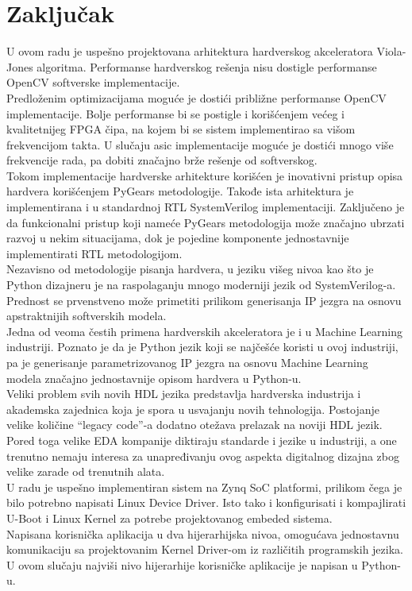 \section{Zaključak}

U ovom radu je uspešno projektovana arhitektura hardverskog akceleratora
Viola-Jones algoritma.
Performanse hardverskog rešenja nisu dostigle performanse OpenCV softverske
implementacije. \\

Predloženim optimizacijama moguće je dostići približne performanse OpenCV
implementacije.
Bolje performanse bi se postigle i korišćenjem većeg i kvalitetnijeg FPGA čipa,
na kojem bi se sistem implementirao sa višom frekvencijom takta.
U slučaju \gls{asic} implementacije moguće je dostići mnogo više
frekvencije rada, pa dobiti značajno brže rešenje od softverskog. \\

Tokom implementacije hardverske arhitekture korišćen je inovativni pristup opisa
hardvera korišćenjem PyGears metodologije.
Takođe ista arhitektura je implementirana i u standardnoj RTL SystemVerilog
implementaciji.
Zaključeno je da funkcionalni pristup koji nameće PyGears metodologija može
značajno ubrzati razvoj u nekim situacijama, dok je pojedine komponente
jednostavnije implementirati RTL metodologijom. \\

Nezavisno od metodologije pisanja hardvera, u jeziku višeg nivoa kao što je
Python dizajneru je na raspolaganju mnogo moderniji jezik od SystemVerilog-a.
Prednost se prvenstveno može primetiti prilikom generisanja IP jezgra na osnovu
apstraktnijih softverskih modela.\\
Jedna od veoma čestih primena hardverskih akceleratora je i u Machine Learning
industriji.
Poznato je da je Python jezik koji se najčešće koristi u ovoj industriji, pa je
generisanje parametrizovanog IP jezgra na osnovu Machine Learning modela značajno
jednostavnije opisom hardvera u Python-u. \\

Veliki problem svih novih HDL jezika predstavlja hardverska industrija i
akademska zajednica koja je spora u usvajanju novih tehnologija.
Postojanje velike količine ``legacy code''-a dodatno otežava prelazak na noviji
HDL jezik. \\
Pored toga velike EDA kompanije diktiraju standarde i jezike u industriji,
a one trenutno nemaju interesa za unapređivanju ovog aspekta digitalnog dizajna
zbog velike zarade od trenutnih alata. \\

U radu je uspešno implementiran sistem na Zynq SoC platformi, prilikom
čega je bilo potrebno napisati Linux Device Driver.
Isto tako i konfigurisati i kompajlirati U-Boot i Linux Kernel za potrebe
projektovanog embeded sistema. \\
Napisana korisnička aplikacija u dva hijerarhijska nivoa, omogućava jednostavnu
komunikaciju sa projektovanim Kernel Driver-om iz različitih programskih jezika.
U ovom slučaju najviši nivo hijerarhije korisničke aplikacije je napisan u
Python-u. \\